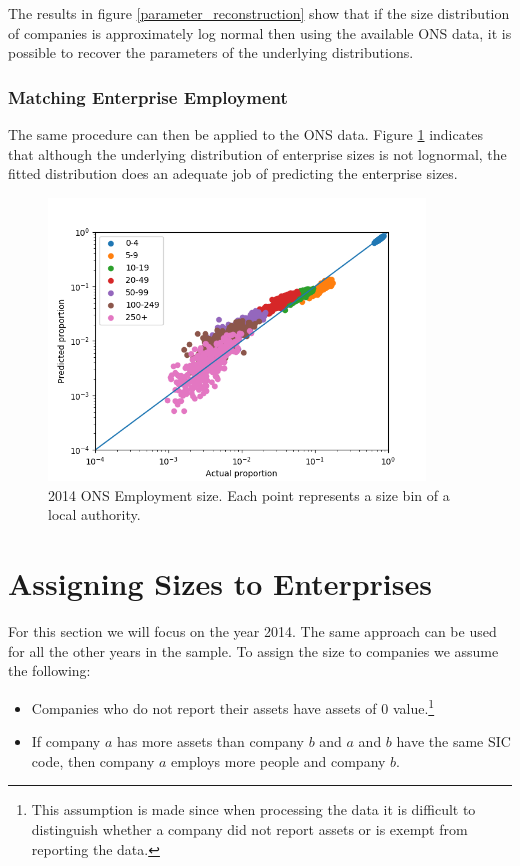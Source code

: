 \documentclass[a4paper,10pt]{article}
\begin{document}
	The results in figure \ref{parameter_reconstruction} show that if the size distribution of companies is approximately log normal then using the available ONS data, it is possible to recover the parameters of the underlying distributions.

   \subsubsection{Matching Enterprise Employment}
   \label{enterprise_employment}
   The same procedure can then be applied to the ONS data. Figure \ref{2014_size_dist_results} indicates that although the underlying distribution of enterprise sizes is not lognormal, the fitted distribution does an adequate job of predicting the enterprise sizes.

   \begin{figure}[!ht]
      \begin{center}
         \caption{2014 ONS Employment size. Each point represents a size bin of a local authority.}
         \label{2014_size_dist_results}
         \includegraphics[width=10cm]{graphs/2014_enterprise_size_by_la}
      \end{center}
   \end{figure}


   \label{enterprise_employment}
   \section{Assigning Sizes to Enterprises}
   For this section we will focus on the year 2014. The same approach can be used for all the other years in the sample. To assign the size to companies we assume the following:
   \begin{itemize}
      \item Companies who do not report their assets have assets of 0 value.\footnote{This assumption is made since when processing the data it is difficult to distinguish whether a company did not report assets or is exempt from reporting the data.}
      \item If company $a$ has more assets than company $b$ and $a$ and $b$ have the same SIC code, then company $a$ employs more people and company $b$.
   \end{itemize}
\end{document}

